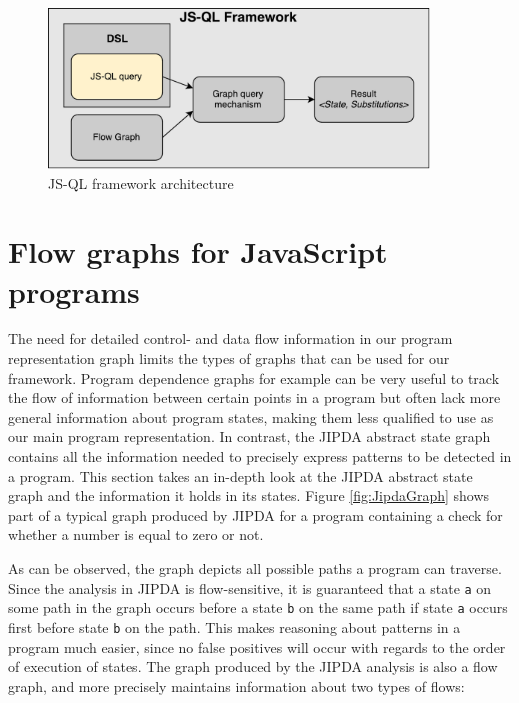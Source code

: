 \begin{figure}
    \centering
      \includegraphics[width=0.9\textwidth]{images/Architecture} 
      \caption{JS-QL framework architecture}
    \label{fig:architecture}
\end{figure}
\section{Flow graphs for JavaScript programs}

The need for detailed control- and data flow information in our program representation graph limits the types of graphs that can be used for our framework. Program dependence graphs\cite{PDG} for example can be very useful to track the flow of information between certain points in a program but often lack more general information about program states, making them less qualified to use as our main program representation. In contrast, the JIPDA\cite{} abstract state graph contains all the information needed to precisely express patterns to be detected in a program. This section takes an in-depth look at the JIPDA abstract state graph and the information it holds in its states. Figure \ref{fig:JipdaGraph} shows part of a typical graph produced by JIPDA for a program containing a check for whether a number is equal to zero or not.

As can be observed, the graph depicts all possible paths a program can traverse. Since the analysis in JIPDA is flow-sensitive, it is guaranteed that a state \texttt{a} on some path in the graph occurs before a state \texttt{b} on the same path if state \texttt{a} occurs first before state \texttt{b} on the path. This makes reasoning about patterns in a program much easier, since no false positives will occur with regards to the order of execution of states. The graph produced by the JIPDA analysis is also a flow graph, and more precisely maintains information about two types of flows:

